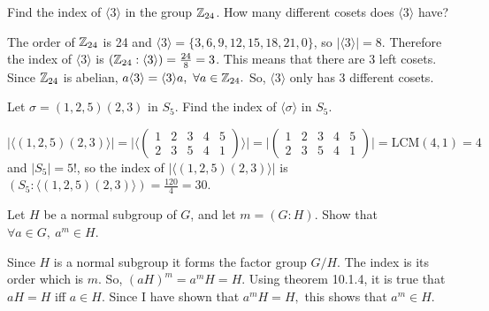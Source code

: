\documentclass[titlepage]{article}
\begin{document}
\begin{problem}{7}
Find the index of $\langle 3 \rangle$ in the group $\mathbb{Z}_{24}$. How many different cosets does $\langle 3 \rangle$ have?
\end{problem}
\begin{solution}
The order of $\mathbb{Z}_{24}$ is 24 and $\langle 3 \rangle = \{3,6,9,12,15,18,21,0\}$, so $|\langle 3 \rangle| = 8.$ Therefore the index of $\langle 3 \rangle$ is $(\mathbb{Z}_{24} : \langle 3 \rangle) = \frac{24}{8} = 3$. This means that there are 3 left cosets. Since $\mathbb{Z}_{24}$ is abelian, $a\langle3\rangle = \langle3\rangle a, \ \forall a \in \mathbb{Z}_{24}.$ So, $\langle 3 \rangle$ only has 3 different cosets.
\end{solution}
\begin{problem}{8}
Let $\sigma = (1,2,5)(2,3)$ in $S_5$. Find the index of $\langle \sigma \rangle$ in $S_5$.
\end{problem}
\begin{solution}
$|\langle(1,2,5)(2,3)\rangle| = \big|\langle(\begin{smallmatrix}1 & 2 & 3 & 4 & 5 \\ 2 & 3 & 5 & 4 & 1 \end{smallmatrix})\rangle\big| =\big|(\begin{smallmatrix}1 & 2 & 3 & 4 & 5 \\ 2 & 3 & 5 & 4 & 1 \end{smallmatrix})\big| = \text{LCM}(4,1) = 4$ and $|S_5| = 5!$, so the index of $|\langle(1,2,5)(2,3)\rangle|$ is $(S_5 : \langle(1,2,5)(2,3)\rangle) = \frac{120}{4} = 30$.
\end{solution}

\begin{problem}{9}
Let $H$ be a normal subgroup of $G$, and let $m = (G:H).$ Show that $\forall a \in G, \ a^m \in H$.
\end{problem}
\begin{solution}
Since $H$ is a normal subgroup it forms the factor group $G/H$. The index is its order which is $m$. So, $(aH)^m = a^mH = H$. Using theorem 10.1.4, it is true that $aH = H$ iff $a \in H$. Since I have shown that $a^mH=H, $ this shows that $a^m \in H$.
\end{solution}
\end{document}
